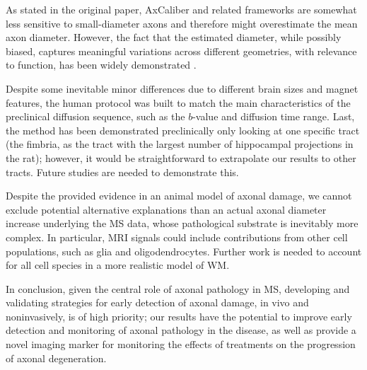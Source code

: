 \documentclass[11pt]{article}
\begin{document}
As stated in the original paper, AxCaliber and related frameworks are somewhat less sensitive to small-diameter axons and therefore might overestimate the mean axon diameter. However, the fact that the estimated diameter, while possibly biased, captures meaningful variations across different geometries, with relevance to function, has been widely demonstrated \cite{Horowitz2015a}.

Despite some inevitable minor differences due to different brain sizes and magnet features, the human protocol was built to match the main characteristics of the preclinical diffusion sequence, such as the $b$-value and diffusion time range. Last, the method has been demonstrated preclinically only looking at one specific tract (the fimbria, as the tract with the largest number of hippocampal projections in the rat); however, it would be straightforward to extrapolate our results to other tracts. Future studies are needed to demonstrate this.

Despite the provided evidence in an animal model of axonal damage, we cannot exclude potential alternative explanations than an actual axonal diameter increase underlying the MS data, whose pathological substrate is inevitably more complex. In particular, MRI signals could include contributions from other cell populations, such as glia and oligodendrocytes. Further work is needed to account for all cell species in a more realistic model of WM.

In conclusion, given the central role of axonal pathology in MS, developing and validating strategies for early detection of axonal damage, in vivo and noninvasively, is of high priority; our results have the potential to improve early detection and monitoring of axonal pathology in the disease, as well as provide a novel imaging marker for monitoring the effects of treatments on the progression of axonal degeneration.



\end{document}
